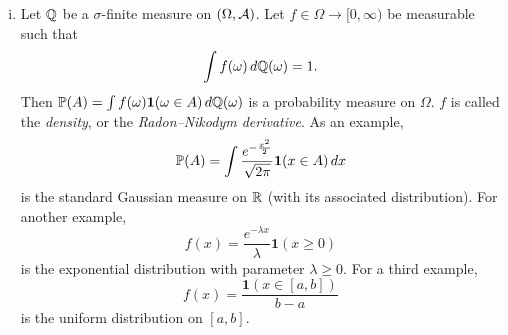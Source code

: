 \begin{enumerate}[(i)]
\begin{proof}
        The hard (if) direction comes from the Carath\'eoodory extension theorem (existence of $\PP$), and the uniqueness was not mentioned.
    \end{proof}
    \item Let $\mathbb Q$ be a $\sigma$-finite measure on $(\Omega, \mathcal A)$. Let $f \in \Omega \to [0, \infty)$ be measurable such that
    \[ \int f(\omega) \, d \mathbb Q(\omega) = 1. \]
    Then $\mathbb P(A) = \int f(\omega) \mathbf{1}(\omega \in A) \, d \mathbb Q(\omega)$ is a probability measure on $\Omega$. $f$ is called the \textit{density}, or the \textit{Radon--Nikodym derivative}. As an example,
    \[ \mathbb P(A) = \int \frac{e^{- \frac{x^2}{2}}}{\sqrt{2\pi}} \mathbf{1}(x \in A) \, dx \]
    is the standard Gaussian measure on $\mathbb R$ (with its associated distribution). For another example,
    \[ f(x) = \frac{e^{-\lambda x}}{\lambda} \mathbf 1(x \geq 0) \]
    is the exponential distribution with parameter $\lambda \geq 0$. For a third example,
    \[ f(x) = \frac{\mathbf 1(x \in [a, b])}{b-a} \]
    is the uniform distribution on $[a, b]$.
\end{enumerate}
